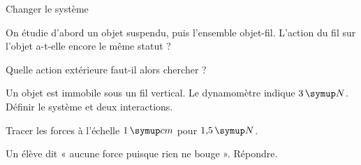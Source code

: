 \par\noindent\begin{minipage}{\linewidth}
\begin{exercice}[3]{Changer le système}
\begin{questions}
\item On étudie d’abord un objet suspendu, puis l’ensemble objet-fil. L’action du fil sur l’objet a-t-elle encore le même statut ?
\item Quelle action extérieure faut-il alors chercher ?
\end{questions}
\end{exercice}
\end{minipage}
\label{defi-ex-10}
\begin{questions}
\item Un objet est immobile sous un fil vertical. Le dynamomètre indique $3\unite N$. Définir le système et deux interactions.
\item Tracer les forces à l’échelle $1\unite{cm}$ pour $1{,}5\unite N$.
\item Un élève dit « aucune force puisque rien ne bouge ». Répondre.
\end{questions}
\pcGrille
